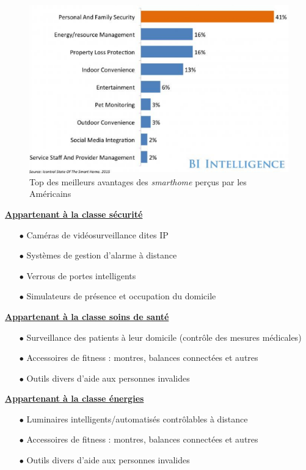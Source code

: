 \documentclass[]{article}
\newcommand{\minit}[1]{{\small\textbf{ \underline{#1}}}~\\}
\begin{document}
\begin{figure}[!h]
\centering
\includegraphics[scale=0.5]{benef_SH.png}
\caption{Top des meilleurs avantages des \textit{smarthome} perçus par les Américains}
\label{benef_SH}
\end{figure}

\minit{Appartenant à la classe sécurité}

\begin{itemize}
\item[$\bullet$] Caméras de vidéosurveillance dites IP
\item[$\bullet$] Systèmes de gestion d'alarme à distance
\item[$\bullet$] Verrous de portes intelligents
\item[$\bullet$] Simulateurs de présence et occupation du domicile
\end{itemize}

\minit{Appartenant à la classe soins de santé}

\begin{itemize}
\item[$\bullet$] Surveillance des patients à leur domicile (contrôle des mesures médicales)
\item[$\bullet$] Accessoires de fitness : montres, balances connectées et autres
\item[$\bullet$] Outils divers d'aide aux personnes invalides 
\end{itemize}

\minit{Appartenant à la classe énergies}

\begin{itemize}
\item[$\bullet$] Luminaires intelligents/automatisés contrôlables à distance
\item[$\bullet$] Accessoires de fitness : montres, balances connectées et autres
\item[$\bullet$] Outils divers d'aide aux personnes invalides  
\end{itemize}
\end{document}
